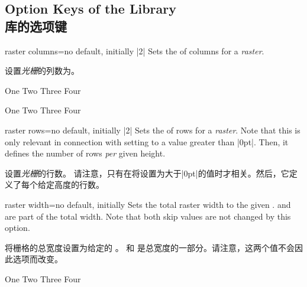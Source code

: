 

\subsection{Option Keys of the Library\\库的选项键}\label{subsec:raster_options}

\begin{docTcbKey}[][doc new=2014-11-10]{raster columns}{=}{no default, initially |2|}
Sets the  of columns for a \emph{raster}.

设置\emph{光栅}的列数为。
\begin{dispExample}
\begin{tcbitemize}[raster columns=3,
size=small,colframe=red!50!black,colback=red!10!white]
\tcbitem One
\tcbitem Two
\tcbitem Three
\tcbitem Four
\end{tcbitemize}
\begin{tcbitemize}[raster columns=4,
size=small,colframe=blue!50!black,colback=blue!10!white]
\tcbitem One
\tcbitem Two
\tcbitem Three
\tcbitem Four
\end{tcbitemize}
\end{dispExample}
\end{docTcbKey}

\begin{docTcbKey}[][doc new=2014-11-10]{raster rows}{=}{no default, initially |2|}
Sets the  of rows for a \emph{raster}.
Note that this is only relevant in connection with setting 
to a value greater than |0pt|. Then, it defines the number of rows \emph{per} given
height.

设置\emph{光栅}的行数。 请注意，只有在将设置为大于|0pt|的值时才相关。然后，它定义了每个给定高度的行数。
\end{docTcbKey}


\begin{docTcbKey}[][doc new=2014-11-10]{raster width}{=}{no default, initially }
Sets the total raster width to the given .
 and  are part
of the total width. Note that both skip values are not changed by this option.

将栅格的总宽度设置为给定的 。  和  是总宽度的一部分。请注意，这两个值不会因此选项而改变。
\begin{dispExample}
\begin{tcbitemize}[raster width=\linewidth/2,
size=small,colframe=red!50!black,colback=red!10!white]
\tcbitem One
\tcbitem Two
\tcbitem Three
\tcbitem Four
\end{tcbitemize}
\end{dispExample}
\end{docTcbKey}


